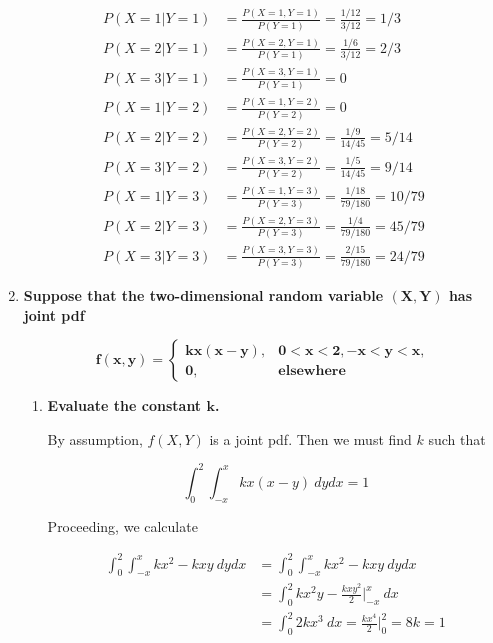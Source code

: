 \documentclass[10pt, oneside]{article}   	%
\theoremstyle{definition}
\begin{document}
\begin{enumerate}[label=6.\arabic*]
\begin{align*}
P(X = 1 | Y = 1) &= \frac{P(X = 1, Y = 1)}{P(Y = 1)} = \frac{1/12}{3/12} = \boxed{1/3} \\
P(X = 2 | Y = 1) &= \frac{P(X = 2, Y = 1)}{P(Y = 1)} = \frac{1/6}{3/12} = \boxed{2/3} \\
P(X = 3 | Y = 1) &= \frac{P(X = 3, Y = 1)}{P(Y = 1)} = \boxed{0} \\
P(X = 1 | Y = 2) &= \frac{P(X = 1, Y = 2)}{P(Y = 2)} = \boxed{0} \\
P(X = 2 | Y = 2) &= \frac{P(X = 2, Y = 2)}{P(Y = 2)} = \frac{1/9}{14/45} = \boxed{5/14} \\
P(X = 3 | Y = 2) &= \frac{P(X = 3, Y = 2)}{P(Y = 2)} = \frac{1/5}{14/45} = \boxed{9/14} \\
P(X = 1 | Y = 3) &= \frac{P(X = 1, Y = 3)}{P(Y = 3)} = \frac{1/18}{79/180} = \boxed{10/79} \\
P(X = 2 | Y = 3) &= \frac{P(X = 2, Y = 3)}{P(Y = 3)} = \frac{1/4}{79/180} = \boxed{45/79} \\
P(X = 3 | Y = 3) &= \frac{P(X = 3, Y = 3)}{P(Y = 3)} = \frac{2/15}{79/180} = \boxed{24/79}
\end{align*}

\newpage
\item  \begin{tcolorbox}[
  colback=Cerulean!5!white,
  colframe=Cerulean!75!black]
\textbf{Suppose that the two-dimensional random variable $\bm{(X,Y)}$ has joint pdf}

\[ \bm{f(x,y) = } \begin{cases} \bm{kx(x-y)}, & \bm{0 < x < 2, -x < y < x,} \\
\bm{0}, & \textbf{elsewhere}
\end{cases} \]
\end{tcolorbox}

	\begin{enumerate}
	\item  \begin{tcolorbox}[
	  colback=Cerulean!5!white,
	  colframe=Cerulean!75!black]
	\textbf{Evaluate the constant $\bm{k}$.}
	\end{tcolorbox}
	
	By assumption, $f(X, Y)$ is a joint pdf. Then we must find $k$ such that
	
	\[ \int^2_0 \int^x_{-x} kx(x-y) \ dy dx = 1 \]
	
	Proceeding, we calculate
	
	\begin{align*}
	\int^2_0 \int^x_{-x} kx^2 - kxy \ dy dx &= \int^2_0 \int^x_{-x} kx^2 - kxy \ dy dx \\
	&= \int^2_0 kx^2 y - \frac{kxy^2}{2} \Big|^x_{-x} \ dx \\
	&= \int^2_0 2kx^3 \ dx = \frac{kx^4}{2} \Big|^2_0 = 8k = 1
	\end{align*}
	

\end{enumerate}
\end{enumerate}
\end{document}
